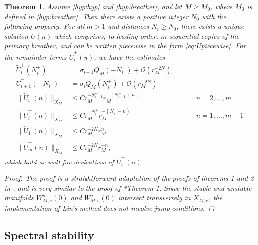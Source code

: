 \documentclass[12pt,reqno]{amsart}
\newtheorem{theorem}{Theorem}
\theoremstyle{definition}
\begin{document}
\begin{theorem}\label{th:multibreathers}
Assume \cref{hyp:hyp} and \cref{hyp:breather}, and let $M \geq M_0$, where $M_0$ is defined in \cref{hyp:breather}. Then there exists a positive integer $N_0$ with the following property. For all $m > 1$ and distances $N_i \geq N_0$, there exists a unique solution $U(n)$ which comprises, to leading order, $m$ sequential copies of the primary breather, and can be written piecewise in the form \cref{eq:Upiecewise}. For the remainder terms $\tilde{U}_i^\pm(n)$, we have the estimates
\begin{equation}\label{eq:Uestimates}
\begin{aligned}
\tilde{U}_i^+(N_i^+) &= \sigma_{i+1} Q_M(-N_i^-) + \mathcal{O}(r_M^{-2N}) \\
\tilde{U}_{i+1}^-(-N_i^-) &= \sigma_{i} Q_M(N_i^+) + \mathcal{O}(r_M^{-2N}) \\ 
\| \tilde{U}_i^-(n)\|_{X_M} &\leq C r_M^{-N_{i-1}^-} r_M^{-(N_{i-1}^- + n)} && \qquad n = 2, \dots, m\\
\|\tilde{U}_i^+(n) \|_{X_M} &\leq C r_M^{-N_i^+} r_M^{-(N_i^+ - n)} && \qquad n = 1, \dots, m-1 \\
\| \tilde{U}_1^-(n)\|_{X_M} &\leq C r_M^{-2N} r_M^{n} \\
\|\tilde{U}_m^+(n) \|_{X_M} &\leq C r_M^{-2N} r_M^{-n},
\end{aligned}
\end{equation}
which hold as well for derivatives of $\tilde{U}_i^\pm(n)$
\begin{proof}
The proof is a straightforward adaptation of the proofs of theorems 1 and 3 in \cite{Parker2020}, and is very similar to the proof of \cite{Parker2021}*{Theorem 1}. Since the stable and unstable manifolds $W_{M,e}^s(0)$ and $W_{M,e}^u(0)$ intersect transversely in $X_{M,e}$, the implementation of Lin's method does not involve jump conditions.
\end{proof}
\end{theorem}

\subsection{Spectral stability}
\end{document}
